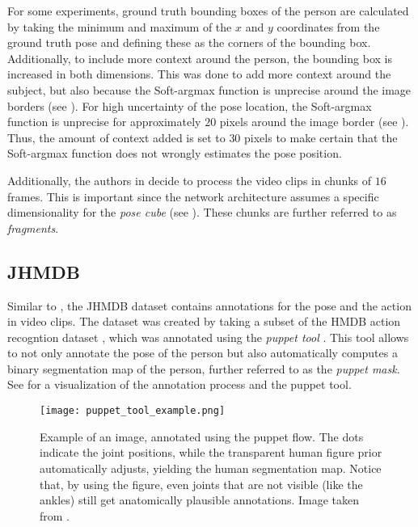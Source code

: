 For some experiments, ground truth bounding boxes of the person are calculated by taking the minimum and maximum of the $x$ and $y$ coordinates from the ground truth pose and defining these as the corners of the bounding box.
Additionally, to include more context around the person, the bounding box is increased in both dimensions.
This was done to add more context around the subject, but also because the Soft-argmax function is unprecise around the image borders (see ).
For high uncertainty of the pose location, the Soft-argmax function is unprecise for approximately $20$ pixels around the image border (see ).
Thus, the amount of context added is set to $30$ pixels to make certain that the Soft-argmax function does not wrongly estimates the pose position.

Additionally, the authors in \cite{luvizon_2d/3d_2018} decide to process the video clips in chunks of $16$ frames.
This is important since the network architecture assumes a specific dimensionality for the \textit{pose cube} (see ).
These chunks are further referred to as \textit{fragments}. 

\subsection{JHMDB}
\label{sec:exp-jhmdb}

Similar to \cite{zhang_actemes_2013} , the JHMDB dataset \cite{jhuang_towards_2013} contains annotations for the pose and the action in video clips.
The dataset was created by taking a subset of the HMDB action recogntion dataset \cite{kuehne_hmdb:_2011}, which was annotated using the \textit{puppet tool} \cite{zuffi_pictorial_2012}.
This tool allows to not only annotate the pose of the person but also automatically computes a binary segmentation map of the person, further referred to as the \textit{puppet mask}.
See  for a visualization of the annotation process and the puppet tool.

\begin{figure}[htb!]
    \centering
    \texttt{[image: puppet\_tool\_example.png]}
    \caption{Example of an image, annotated using the puppet flow. The dots indicate the joint positions, while the transparent human figure prior automatically adjusts, yielding the human segmentation map. Notice that, by using the figure, even joints that are not visible (like the ankles) still get anatomically plausible annotations. Image taken from \cite{max_planck_institute_for_intelligent_systems_jhmdb_nodate}.}
    \label{fig:puppet_tool_example}
\end{figure}


